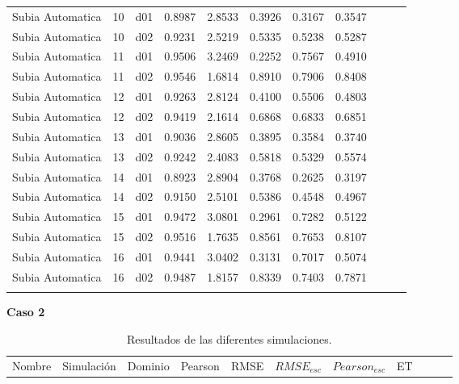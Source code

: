 \begin{landscape}
\begin{longtable}{p{2cm}rrrrrrrrrr}
     Subia Automatica  &         10 &     d01 &   0.8987 &  2.8533 &        0.3926 &           0.3167 &  0.3547 \\
     Subia Automatica  &         10 &     d02 &   0.9231 &  2.5219 &        0.5335 &           0.5238 &  0.5287 \\
     Subia Automatica  &         11 &     d01 &   0.9506 &  3.2469 &        0.2252 &           0.7567 &  0.4910 \\
     Subia Automatica  &         11 &     d02 &   0.9546 &  1.6814 &        0.8910 &           0.7906 &  0.8408 \\
     Subia Automatica  &         12 &     d01 &   0.9263 &  2.8124 &        0.4100 &           0.5506 &  0.4803 \\
     Subia Automatica  &         12 &     d02 &   0.9419 &  2.1614 &        0.6868 &           0.6833 &  0.6851 \\
     Subia Automatica  &         13 &     d01 &   0.9036 &  2.8605 &        0.3895 &           0.3584 &  0.3740 \\
     Subia Automatica  &         13 &     d02 &   0.9242 &  2.4083 &        0.5818 &           0.5329 &  0.5574 \\
     Subia Automatica  &         14 &     d01 &   0.8923 &  2.8904 &        0.3768 &           0.2625 &  0.3197 \\
     Subia Automatica  &         14 &     d02 &   0.9150 &  2.5101 &        0.5386 &           0.4548 &  0.4967 \\
     Subia Automatica  &         15 &     d01 &   0.9472 &  3.0801 &        0.2961 &           0.7282 &  0.5122 \\
     Subia Automatica  &         15 &     d02 &   0.9516 &  1.7635 &        0.8561 &           0.7653 &  0.8107 \\
     Subia Automatica  &         16 &     d01 &   0.9441 &  3.0402 &        0.3131 &           0.7017 &  0.5074 \\
     Subia Automatica  &         16 &     d02 &   0.9487 &  1.8157 &        0.8339 &           0.7403 &  0.7871 \\

\label{tab:estaciones_tiempo_wrf}

\end{longtable}


\textbf{Caso 2}
\begin{longtable}{p{2cm}rrrrrrrrrr}
\caption{Resultados de las diferentes simulaciones.}
\label{tab:estaciones_tiempo_wrf}\\
\hline
   Nombre &  Simulación & Dominio &  Pearson &     RMSE &  $RMSE_{esc}$ &    $Pearson_{esc}$ &      ET \\
   

\end{longtable}
\end{landscape}
